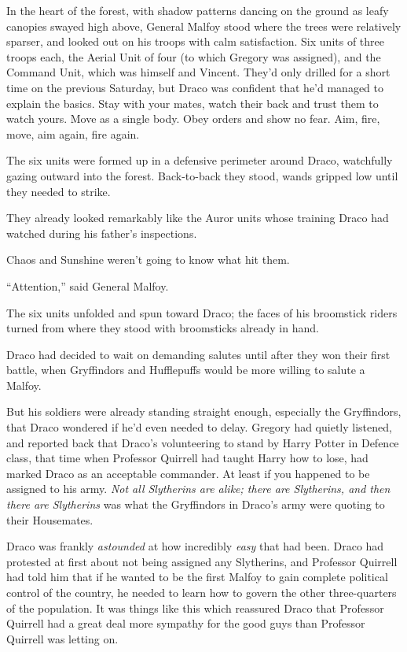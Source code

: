 In the heart of the forest, with shadow patterns dancing on the ground
as leafy canopies swayed high above, General Malfoy stood where the
trees were relatively sparser, and looked out on his troops with calm
satisfaction. Six units of three troops each, the Aerial Unit of four
(to which Gregory was assigned), and the Command Unit, which was himself
and Vincent. They'd only drilled for a short time on the previous
Saturday, but Draco was confident that he'd managed to explain the
basics. Stay with your mates, watch their back and trust them to watch
yours. Move as a single body. Obey orders and show no fear. Aim, fire,
move, aim again, fire again.

The six units were formed up in a defensive perimeter around Draco,
watchfully gazing outward into the forest. Back-to-back they stood,
wands gripped low until they needed to strike.

They already looked remarkably like the Auror units whose training Draco
had watched during his father's inspections.

Chaos and Sunshine weren't going to know what hit them.

``Attention,'' said General Malfoy.

The six units unfolded and spun toward Draco; the faces of his
broomstick riders turned from where they stood with broomsticks already
in hand.

Draco had decided to wait on demanding salutes until after they won
their first battle, when Gryffindors and Hufflepuffs would be more
willing to salute a Malfoy.

But his soldiers were already standing straight enough, especially the
Gryffindors, that Draco wondered if he'd even needed to delay. Gregory
had quietly listened, and reported back that Draco's volunteering to
stand by Harry Potter in Defence class, that time when Professor
Quirrell had taught Harry how to lose, had marked Draco as an acceptable
commander. At least if you happened to be assigned to his army.
\emph{Not all Slytherins are alike; there are Slytherins, and then there
are Slytherins} was what the Gryffindors in Draco's army were quoting to
their Housemates.

Draco was frankly \emph{astounded} at how incredibly \emph{easy} that
had been. Draco had protested at first about not being assigned any
Slytherins, and Professor Quirrell had told him that if he wanted to be
the first Malfoy to gain complete political control of the country, he
needed to learn how to govern the other three-quarters of the
population. It was things like this which reassured Draco that Professor
Quirrell had a great deal more sympathy for the good guys than Professor
Quirrell was letting on.

